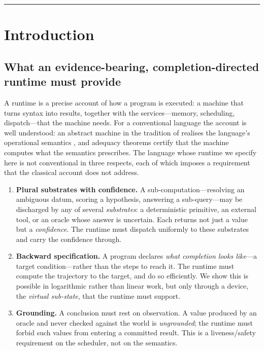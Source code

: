 \documentclass[11pt,a4paper]{article}
\theoremstyle{plain}
\theoremstyle{definition}
\theoremstyle{remark}
\begin{document}
\tableofcontents
\bigskip\hrule

\section{Introduction}
\label{sec:intro}

\subsection{What an evidence-bearing, completion-directed runtime must provide}

A runtime is a precise account of how a program is executed: a machine that
turns syntax into results, together with the services---memory, scheduling,
dispatch---that the machine needs. For a conventional language the account is
well understood: an abstract machine in the tradition of \citet{landin1964,
felleisen1992} realises the language's operational semantics
\citep{plotkin1981,kahn1987,winskel1993}, and adequacy theorems
\citep{ager2003,reynolds1972} certify that the machine computes what the
semantics prescribes. The language whose runtime we specify here is not
conventional in three respects, each of which imposes a requirement that the
classical account does not address.

\begin{enumerate}[leftmargin=1.5em]
\item \textbf{Plural substrates with confidence.} A sub-computation---resolving
an ambiguous datum, scoring a hypothesis, answering a sub-query---may be
discharged by any of several \emph{substrates}: a deterministic primitive, an
external tool, or an oracle whose answer is uncertain. Each returns not just a
value but a \emph{confidence}. The runtime must dispatch uniformly to these
substrates and carry the confidence through.

\item \textbf{Backward specification.} A program declares \emph{what completion
looks like}---a target condition---rather than the steps to reach it. The
runtime must compute the trajectory to the target, and do so efficiently. We
show this is possible in logarithmic rather than linear work, but only through a
device, the \emph{virtual sub-state}, that the runtime must support.

\item \textbf{Grounding.} A conclusion must rest on observation. A value
produced by an oracle and never checked against the world is \emph{ungrounded};
the runtime must forbid such values from entering a committed result. This is a
liveness/safety requirement on the scheduler, not on the semantics.
\end{enumerate}
\end{document}
